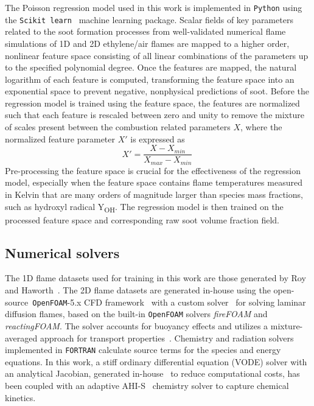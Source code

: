 \documentclass[12pt]{CHT-20}
\begin{document}
The Poisson regression model used in this work is implemented in \texttt{Python} using the \texttt{Scikit learn}~\citep[]{scikit-learn} machine learning package. Scalar fields of key parameters related to the soot formation processes from well-validated numerical flame simulations of 1D and 2D ethylene/air flames are mapped to a higher order, nonlinear feature space consisting of all linear combinations of the parameters up to the specified polynomial degree. Once the features are mapped, the natural logarithm of each feature is computed, transforming the feature space into an exponential space to prevent negative, nonphysical predictions of soot. Before the regression model is trained using the feature space, the features are normalized such that each feature is rescaled between zero and unity to remove the mixture of scales present between the combustion related parameters $X$, where the normalized feature parameter $X'$ is expressed as
\begin{equation}
    X' = \frac{X-X_{min}}{X_{max}-X_{min}} \ 
\end{equation}
Pre-processing the feature space is crucial for the effectiveness of the regression model, especially when the feature space contains flame temperatures measured in Kelvin that are many orders of magnitude larger than species mass fractions, such as hydroxyl radical Y\textsubscript{OH}. The regression model is then trained on the processed feature space and corresponding raw soot volume fraction field.



\subsection{Numerical solvers}
The 1D flame datasets used for training in this work are those generated by Roy and Haworth~\citep[]{Roy,Roy_Haworth}. The 2D flame datasets are generated in-house using the open-source~\texttt{OpenFOAM}-5.x CFD framework~\citep[]{OpenFOAM} with a custom solver~\citep[]{Wu:2020,Squeo2021} for solving laminar diffusion flames, based on the built-in \texttt{OpenFOAM} solvers \emph{fireFOAM} and \emph{reactingFOAM}. The solver accounts for buoyancy effects and utilizes a mixture-averaged approach for transport properties~\citep[]{Wu2019}. Chemistry and radiation solvers implemented in \texttt{FORTRAN} calculate source terms for the species and energy equations. In this work, a stiff ordinary differential equation (VODE) solver with an analytical Jacobian, generated in-house~\citep[]{Lu2009} to reduce computational costs, has been coupled with an adaptive AHI-S~\citep[]{Xu2016} chemistry solver to capture chemical kinetics.
\end{document}
